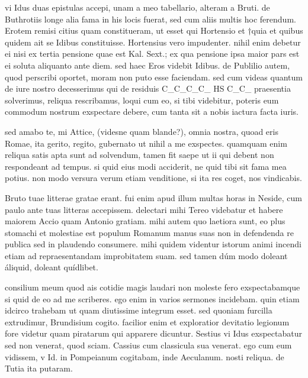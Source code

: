 


 vi Idus duas epistulas accepi, unam a meo tabellario, alteram a Bruti. de Buthrotiis longe alia fama in his locis fuerat, sed cum aliis multis hoc ferendum. Erotem remisi citius quam constitueram, ut esset qui Hortensio et †quia et quibus quidem ait se Idibus constituisse. Hortensius vero impudenter. nihil enim debetur ei nisi ex tertia pensione quae est Kal. Sext.; ex qua pensione ipsa maior pars est ei soluta aliquanto ante diem. sed haec Eros videbit Idibus. de Publilio autem, quod perscribi oportet, moram non puto esse faciendam. sed cum videas quantum de iure nostro decesserimus qui de residuis C_C_C_C_ HS C_C_ praesentia solverimus, reliqua rescribamus, loqui cum eo, si tibi videbitur, poteris eum commodum nostrum exspectare debere, cum tanta sit a nobis iactura facta iuris.

 sed amabo te, mi Attice, (videsne quam blande?), omnia nostra, quoad eris Romae, ita gerito, regito, gubernato ut nihil a me exspectes. quamquam enim reliqua satis apta sunt ad solvendum, tamen fit saepe ut ii qui debent non respondeant ad tempus. si quid eius modi acciderit, ne quid tibi sit fama mea potius. non modo versura verum etiam venditione, si ita res coget, nos vindicabis.

 Bruto tuae litterae gratae erant. fui enim apud illum multas horas in Neside, cum paulo ante tuas litteras accepissem. delectari mihi Tereo videbatur et habere maiorem Accio quam Antonio gratiam. mihi autem quo laetiora sunt, eo plus stomachi et molestiae est populum Romanum manus suas non in defendenda re publica sed in plaudendo consumere. mihi quidem videntur istorum animi incendi etiam ad repraesentandam improbitatem suam. sed tamen dúm modo doleant áliquid, doleant quídlibet.

 consilium meum quod ais cotidie magis laudari non moleste fero exspectabamque si quid de eo ad me scriberes. ego enim in varios sermones incidebam. quin etiam idcirco trahebam ut quam diutissime integrum esset. sed quoniam furcilla extrudimur, Brundisium cogito. facilior enim et exploratior devitatio legionum fore videtur quam piratarum qui apparere dicuntur. Sestius vi Idus exspectabatur sed non venerat, quod sciam. Cassius cum classicula sua venerat. ego cum eum vidissem, v Id. in Pompeianum cogitabam, inde Aeculanum. nosti reliqua. de Tutia ita putaram.


